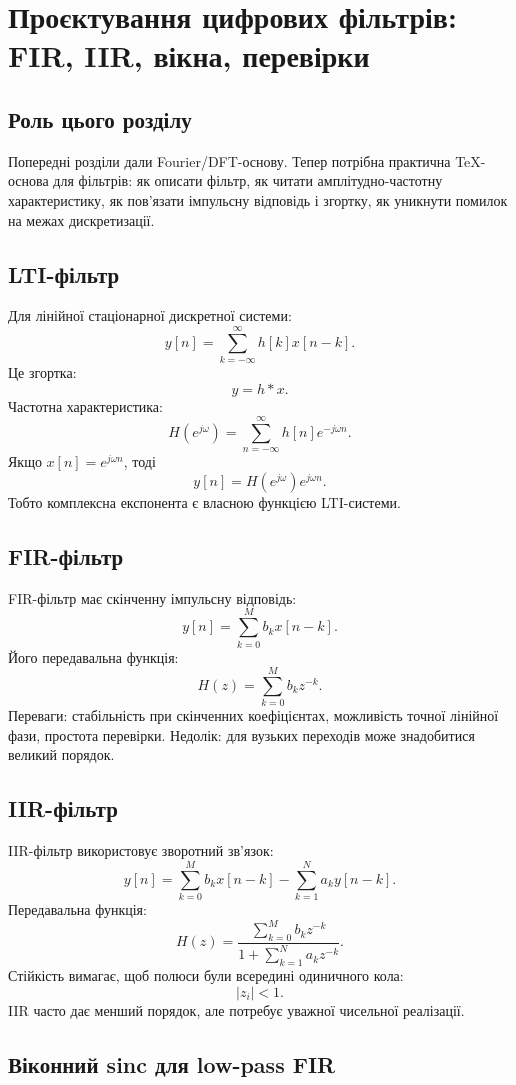 
\chapter{Проєктування цифрових фільтрів: FIR, IIR, вікна, перевірки}

\section{Роль цього розділу}

Попередні розділи дали Fourier/DFT-основу. Тепер потрібна практична TeX-основа для фільтрів: як описати фільтр, як читати амплітудно-частотну характеристику, як пов'язати імпульсну відповідь і згортку, як уникнути помилок на межах дискретизації.

\section{LTI-фільтр}

Для лінійної стаціонарної дискретної системи:
\[
y[n]=\sum_{k=-\infty}^{\infty}h[k]x[n-k].
\]
Це згортка:
\[
y=h*x.
\]
Частотна характеристика:
\[
H(e^{j\omega})=\sum_{n=-\infty}^{\infty}h[n]e^{-j\omega n}.
\]
Якщо $x[n]=e^{j\omega n}$, тоді
\[
y[n]=H(e^{j\omega})e^{j\omega n}.
\]
Тобто комплексна експонента є власною функцією LTI-системи.

\section{FIR-фільтр}

FIR-фільтр має скінченну імпульсну відповідь:
\[
y[n]=\sum_{k=0}^{M} b_k x[n-k].
\]
Його передавальна функція:
\[
H(z)=\sum_{k=0}^{M}b_k z^{-k}.
\]
Переваги: стабільність при скінченних коефіцієнтах, можливість точної лінійної фази, простота перевірки. Недолік: для вузьких переходів може знадобитися великий порядок.

\section{IIR-фільтр}

IIR-фільтр використовує зворотний зв'язок:
\[
y[n]=\sum_{k=0}^{M}b_kx[n-k]-\sum_{k=1}^{N}a_k y[n-k].
\]
Передавальна функція:
\[
H(z)=
\frac{\sum_{k=0}^{M}b_kz^{-k}}
{1+\sum_{k=1}^{N}a_kz^{-k}}.
\]
Стійкість вимагає, щоб полюси були всередині одиничного кола:
\[
|z_i|<1.
\]
IIR часто дає менший порядок, але потребує уважної чисельної реалізації.

\section{Віконний sinc для low-pass FIR}

